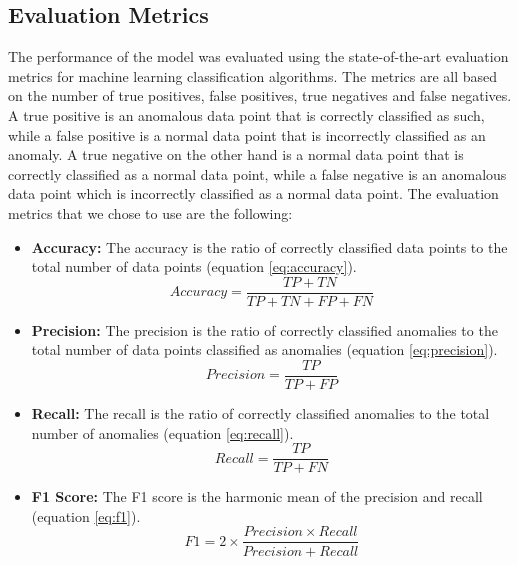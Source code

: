 \documentclass[futureinternet,article,submit,pdftex,moreauthors]{Definitions/mdpi}
\begin{document}
\subsection{Evaluation Metrics}\label{EvaluationMetrics}

The performance of the model was evaluated using the state-of-the-art evaluation metrics for machine learning classification algorithms. The metrics are all based on the number of true positives, false positives, true negatives and false negatives. A true positive is an anomalous data point that is correctly classified as such, while a false positive is a normal data point that is incorrectly classified as an anomaly. A true negative on the other hand is a normal data point that is correctly classified as a normal data point, while a false negative is an anomalous data point which is incorrectly classified as a normal data point.
The evaluation metrics that we chose to use are the following: 

\begin{itemize}
	\item \textbf{Accuracy:} The accuracy is the ratio of correctly classified data points to the total number of data points (equation \ref{eq:accuracy}).
	\begin{equation}
		\label{eq:accuracy}
	  Accuracy = \frac{TP + TN}{TP + TN + FP + FN}
	\end{equation}
	\item \textbf{Precision:} The precision is the ratio of correctly classified anomalies to the total number of data points classified as anomalies (equation \ref{eq:precision}).
	\begin{equation}
		\label{eq:precision}
	  Precision = \frac{TP}{TP + FP}
	\end{equation}
	\item \textbf{Recall:} The recall is the ratio of correctly classified anomalies to the total number of anomalies (equation \ref{eq:recall}).
	\begin{equation}
		\label{eq:recall}
	  Recall = \frac{TP}{TP + FN}
	\end{equation}
	\item \textbf{F1 Score:} The F1 score is the harmonic mean of the precision and recall (equation \ref{eq:f1}).
	\begin{equation}
		\label{eq:f1}
	  F1 = 2 \times \frac{Precision \times Recall}{Precision + Recall}
	\end{equation}
\end{itemize}
\end{document}
